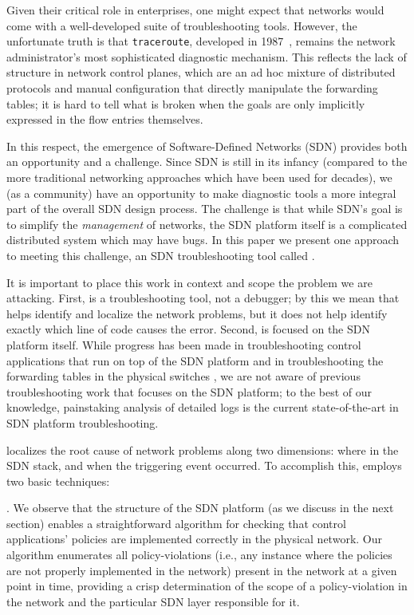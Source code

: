 Given their critical role in enterprises, one might expect that networks
would come with a well-developed suite of troubleshooting tools. However,
the unfortunate truth is that {\tt traceroute}, developed in 1987~\cite{traceroute},
remains the network administrator's most sophisticated diagnostic mechanism. This reflects
the lack of structure in network control planes, which are an ad hoc mixture of
distributed protocols and manual configuration that directly manipulate the forwarding tables; it is hard to tell what is broken
when the goals are only implicitly expressed in the flow entries themselves.

In this respect, the emergence of Software-Defined
Networks (SDN) provides both an opportunity and a challenge. Since SDN
is still in its infancy (compared to the more traditional networking approaches which have been
used for decades), we (as a community) have an opportunity to make diagnostic tools
a more integral part of the overall SDN design process. The challenge is that while SDN's goal is to simplify the
{\em management} of networks, the SDN platform itself is a complicated distributed system which may have bugs.
In this paper we present one approach to meeting this challenge, an SDN troubleshooting tool called \projectname{}.

It is important to place this work in context and scope the problem we are attacking.  First, \projectname{} is a troubleshooting tool, not a debugger; by this we mean that \projectname{} helps identify and localize the network problems, but it does not help  identify exactly which line of code causes the error. Second, \projectname{} is focused on the SDN platform itself. While progress has been made in troubleshooting control
applications that run on top of the SDN platform \cite{nice} and in troubleshooting the forwarding tables in the physical switches \cite{anteater,hsa}, we  
are not aware of previous troubleshooting work that focuses on the SDN platform; to the best of our knowledge, painstaking analysis of detailed logs is the current state-of-the-art in SDN platform troubleshooting. 


\projectname{} localizes the root cause
of network problems along two dimensions: where in the SDN stack, and when the triggering event occurred. To accomplish this, 
\projectname{} employs two basic techniques:

. We observe that the structure of the
SDN platform (as we discuss in the next section) enables a straightforward algorithm for
checking that control applications' policies are implemented correctly in
the physical network. Our algorithm enumerates all policy-violations (i.e., any instance where the policies are not properly implemented in the network) present in the network at a given point in
time, providing a crisp determination of the scope of a policy-violation in the
network and the particular SDN layer responsible 
for it.

